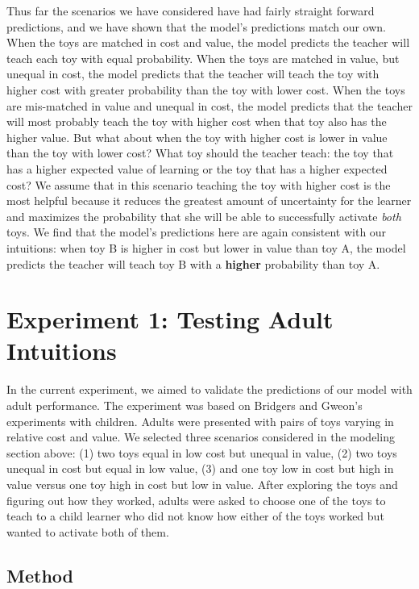 \documentclass[10pt,letterpaper]{article}
\begin{document}
Thus far the scenarios we have considered have had fairly straight forward predictions, and we have shown that the model's predictions match our own. When the toys are matched in cost and value, the model predicts the teacher will teach each toy with equal probability. When the toys are matched in value, but unequal in cost, the model predicts that the teacher will teach the toy with higher cost with greater probability than the toy with lower cost. When the toys are mis-matched in value and unequal in cost, the model predicts that the teacher will most probably teach the toy with higher cost when that toy also has the higher value. But what about when the toy with higher cost is lower in value than the toy with lower cost? What toy should the teacher teach: the toy that has a higher expected value of learning or the toy that has a higher expected cost? We assume that in this scenario teaching the toy with higher cost is the most helpful because it reduces the greatest amount of uncertainty for the learner and maximizes the probability that she will be able to successfully activate \textit{both} toys. We find that the model's predictions here are again consistent with our intuitions: when toy B is higher in cost but lower in value than toy A, the model predicts the teacher will teach toy B with a \textbf{higher} probability than toy A.

\section{Experiment 1: Testing Adult Intuitions}

In the current experiment, we aimed to validate the predictions of our model with adult performance. The experiment was based on Bridgers and Gweon's experiments with children. Adults were presented with pairs of toys varying in relative cost and value. We selected three scenarios considered in the modeling section above: (1) two toys equal in low cost but unequal in value, (2) two toys unequal in cost but equal in low value, (3) and one toy low in cost but high in value versus one toy high in cost but low in value. After exploring the toys and figuring out how they worked, adults were asked to choose one of the toys to teach to a child learner who did not know how either of the toys worked but wanted to activate both of them. 

\subsection{Method}
\end{document}
